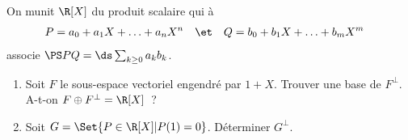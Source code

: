\begin{enonce}
\begin{exercise}[ID={RMS123 E980, TPE PSI},subtitle={},tags={}, difficulty={0}]
On munit $\R[X]$ du produit scalaire qui à
\begin{align*}
P&=a_0+a_1X+\dotsc+a_n X^n&
&\et&
Q&=b_0+b_1X+\dotsc+b_mX^m
\end{align*}
associe
\begin{math}
  \PS PQ = 
  \ds\sum_{k\geq 0} a_k b_k
\end{math}.
\begin{enumerate}
  \item Soit $F$ le sous-espace vectoriel engendré par $1+X$. Trouver une base de $F^\perp$. A-t-on $F\oplus F^\perp=\R[X]$~?
  \item Soit $G=\Set{P\in\R[X]| P(1)=0}$. Déterminer $G^\perp$.
\end{enumerate}
\end{exercise}
\begin{solution}
\end{solution}
\end{enonce}

